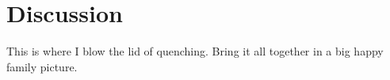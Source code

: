 \chapter{Discussion}

This is where I blow the lid of quenching. Bring it all together in a big happy family picture. 